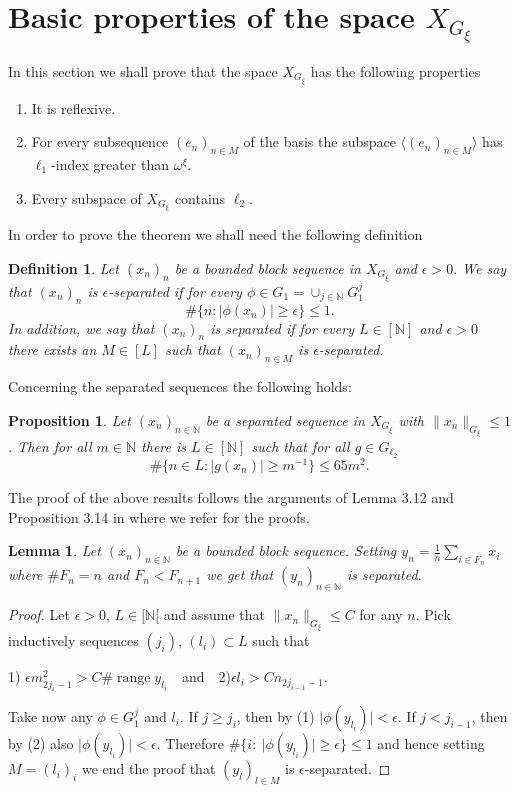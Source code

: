 \documentclass[a4paper]{amsart}
\theoremstyle{plain}
\newtheorem{lemma}[theorem]{Lemma}
\newtheorem{proposition}[theorem]{Proposition}
\newtheorem{definition}[theorem]{Definition}
\newcommand{\N}{\mathbb{N}}
\newcommand{\e}{\epsilon}
\newcommand{\norm}[1][\cdot]{\lVert #1\rVert}
\newcommand{\xn}[1][x]{(#1_{n})_{n\in\N}}
\DeclareMathOperator{\ran}{range}
\begin{document}
\section{Basic properties of the space $X_{G_{\xi}}$}\label{sec5}
In this section we shall prove that the space
$X_{G_{\xi}}$ has the following properties
 \begin{enumerate}
 \item[1)] It is reflexive.
\item[2)] For every subsequence $(e_{n})_{n\in M}$ of the basis the subspace $\langle (e_{n})_{n\in M}\rangle$ has   $\ell_{1}$-index greater than $\omega^{\xi}$.
\item[3)] Every subspace of $X_{G_{\xi}}$ contains $\ell_{2}$.
\end{enumerate}
In order  to prove the theorem we shall need the following definition
\begin{definition} \label{aa1} Let $(x_n)_n$ be a bounded block
sequence in $X_{G_{\xi}}$ and $\e >0.$ We say that $(x_n)_n$ is {\em
$\e$-separated} if for every $\phi\in G_{1}=\cup_{j\in
\mathbb{N}}G_{1}^j$
$$
\# \{n: |\phi(x_n)|\ge\e \}\le 1.
$$
In addition, we say that $(x_n)_n$ is {\em separated} if for every
$L\in [\N]$ and $\e >0$ there exists an $M\in [L]$ such that
$(x_n)_{n\in M}$ is $\e$-separated.
\end{definition}
Concerning the  separated sequences the following holds:
\begin{proposition}\label{aa4}
Let $(x_n)_{n\in\N}$ be a  separated sequence in $X_{G_{\xi}}$ with
$\norm[x_n]_{G_\xi}\leq 1$. Then for all $m\in\N$ there is $L\in[\N]$ such that for all
$g\in G_{\ell_2}$
 $$
\#\{n\in L: \vert g(x_n)\vert\geq m^{-1}\}\leq 65m^2.
$$
\end{proposition}
The proof of the above results follows the arguments of Lemma 3.12 and Proposition 3.14 in \cite{AAT} where  we refer  for the proofs.
\begin{lemma}\label{l1a}
Let  $\xn$ be a bounded block sequence. Setting $y_{n}=\frac{1}{n}\sum_{i\in F_{n}}x_i$
where $\# F_{n}=n$ and $F_{n}<F_{n+1}$ we get that $\xn[y]$ is separated.
\end{lemma}
\begin{proof}
Let  $\e>0$, $L\in [\N[ $  and  assume that $\norm[x_n]_{G_\xi}\leq C$ for any $n$.
Pick inductively sequences $(j_i)$, $(l_i)\subset L$ such that
\begin{center}
1) $\e m_{2j_i-1}^2>C\#\ran y_{l_i}$\,\,\,\  and\,\,\,\
2)$\e l_i>Cn_{2j_{i-1}-1}$.
\end{center}
Take now any $\phi\in G_1^j$ and $l_i$. If $j\geq j_i$, then by (1) $\vert\phi
(y_{l_i})\vert <\e$. If $j<j_{i-1}$, then by (2) also $\vert\phi (y_{l_i})\vert <\e$.
Therefore $\#\{i:\ \vert\phi (y_{l_i})\vert \geq \e\}\leq 1$ and hence setting
$M=(l_i)_i$ we end the proof that $(y_l)_{l\in M}$ is $\e$-separated.
\end{proof}
\end{document}
